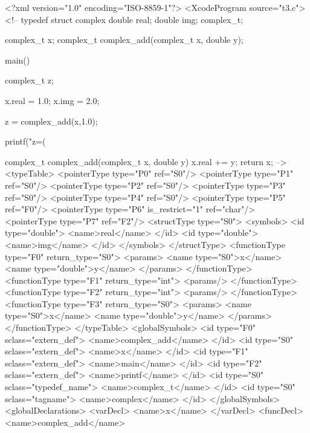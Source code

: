 \vspace{1mm}
 
\begin{XcodeMLExample}
<?xml version="1.0" encoding="ISO-8859-1"?>
<XcodeProgram source="t3.c">
  <!-- 
    typedef struct complex {
        double real;
        double img;
    } complex_t;
    
    complex_t x;
    complex_t complex_add(complex_t x, double y);
        
    main()
    {
        complex_t z;
    
        x.real = 1.0;
        x.img = 2.0;
        
        z = complex_add(x,1.0);
    
        printf("z=(%
    
    }
    complex_t complex_add(complex_t x, double y)
    {
        x.real += y;
        return x;
    }
  -->
  <typeTable>
    <pointerType type="P0" ref="S0"/>
    <pointerType type="P1" ref="S0"/>
    <pointerType type="P2" ref="S0"/>
    <pointerType type="P3" ref="S0"/>
    <pointerType type="P4" ref="S0"/>
    <pointerType type="P5" ref="F0"/>
    <pointerType type="P6" is_restrict="1" ref="char"/>
    <pointerType type="P7" ref="F2"/>
    <structType type="S0">
      <symbols>
        <id type="double">
          <name>real</name>
        </id>
        <id type="double">
          <name>img</name>
        </id>
      </symbols>
    </structType>
    <functionType type="F0" return_type="S0">
      <params>
        <name type="S0">x</name>
        <name type="double">y</name>
      </params>
    </functionType>
    <functionType type="F1" return_type="int">
      <params/>
    </functionType>
    <functionType type="F2" return_type="int">
      <params/>
    </functionType>
    <functionType type="F3" return_type="S0">
      <params>
        <name type="S0">x</name>
        <name type="double">y</name>
      </params>
    </functionType>
  </typeTable>
  <globalSymbols>
    <id type="F0" sclass="extern_def">
      <name>complex_add</name>
    </id>
    <id type="S0" sclass="extern_def">
      <name>x</name>
    </id>
    <id type="F1" sclass="extern_def">
      <name>main</name>
    </id>
    <id type="F2" sclass="extern_def">
      <name>printf</name>
    </id>
    <id type="S0" sclass="typedef_name">
      <name>complex_t</name>
    </id>
    <id type="S0" sclass="tagname">
      <name>complex</name>
    </id>
  </globalSymbols>
  <globalDeclarations>
    <varDecl>
      <name>x</name>
    </varDecl>
    <funcDecl>
      <name>complex_add</name>

\end{XcodeMLExample}
